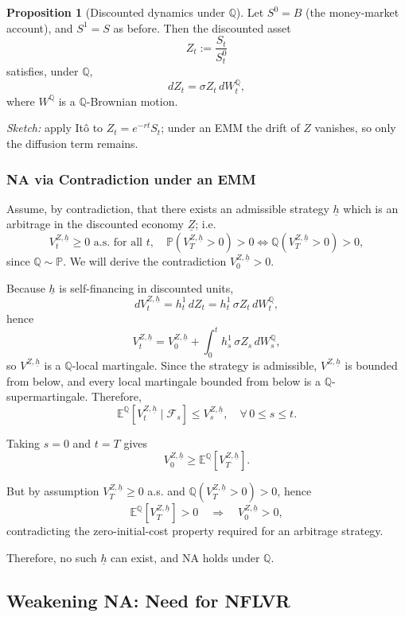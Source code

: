 \documentclass[12pt,a4paper]{article}
\theoremstyle{definition}
\newtheorem{proposition}{Proposition}[section]
\begin{document}
\begin{proposition}[Discounted dynamics under $\mathbb{Q}$]
Let $S^0 = B$ (the money-market account), and $S^1 = S$ as before. Then the discounted asset
\[
Z_t := \frac{S_t}{S_t^0}
\]
satisfies, under $\mathbb{Q}$,
\[
dZ_t = \sigma Z_t \, dW_t^\mathbb{Q},
\]
where $W^\mathbb{Q}$ is a $\mathbb{Q}$-Brownian motion.

\textit{Sketch:} apply Itô to $Z_t = e^{-rt} S_t$; under an EMM the drift of $Z$ vanishes, so only the diffusion term remains.
\end{proposition}

\subsubsection{NA via Contradiction under an EMM}

Assume, by contradiction, that there exists an admissible strategy $\underline{h}$ which is an arbitrage in the discounted economy $\underline{Z}$; i.e.
\[
V_t^{Z,\underline{h}} \geq 0 \text{ a.s. for all } t, \quad \mathbb{P}(V_T^{Z,\underline{h}} > 0) > 0 \iff \mathbb{Q}(V_T^{Z,\underline{h}} > 0) > 0,
\]
since $\mathbb{Q} \sim \mathbb{P}$. We will derive the contradiction $V_0^{Z,\underline{h}} > 0$.

Because $\underline{h}$ is self-financing in discounted units,
\[
dV_t^{Z,\underline{h}} = h_t^1 \, dZ_t = h_t^1 \, \sigma Z_t \, dW_t^\mathbb{Q},
\]
hence
\[
V_t^{Z,\underline{h}} = V_0^{Z,\underline{h}} + \int_0^t h_s^1 \, \sigma Z_s \, dW_s^\mathbb{Q},
\]
so $V^{Z,\underline{h}}$ is a $\mathbb{Q}$-local martingale. Since the strategy is admissible, $V^{Z,\underline{h}}$ is bounded from below, and every local martingale bounded from below is a $\mathbb{Q}$-supermartingale. Therefore,
\[
\mathbb{E}^\mathbb{Q}[V_t^{Z,\underline{h}} \mid \mathcal{F}_s] \leq V_s^{Z,\underline{h}}, \quad \forall \, 0 \leq s \leq t.
\]

Taking $s = 0$ and $t = T$ gives
\[
V_0^{Z,\underline{h}} \geq \mathbb{E}^\mathbb{Q}[V_T^{Z,\underline{h}}].
\]

But by assumption $V_T^{Z,\underline{h}} \geq 0$ a.s. and $\mathbb{Q}(V_T^{Z,\underline{h}} > 0) > 0$, hence
\[
\mathbb{E}^\mathbb{Q}[V_T^{Z,\underline{h}}] > 0 \quad \Longrightarrow \quad V_0^{Z,\underline{h}} > 0,
\]
contradicting the zero-initial-cost property required for an arbitrage strategy.

Therefore, no such $\underline{h}$ can exist, and NA holds under $\mathbb{Q}$.

\subsection{Weakening NA: Need for NFLVR}
\end{document}
